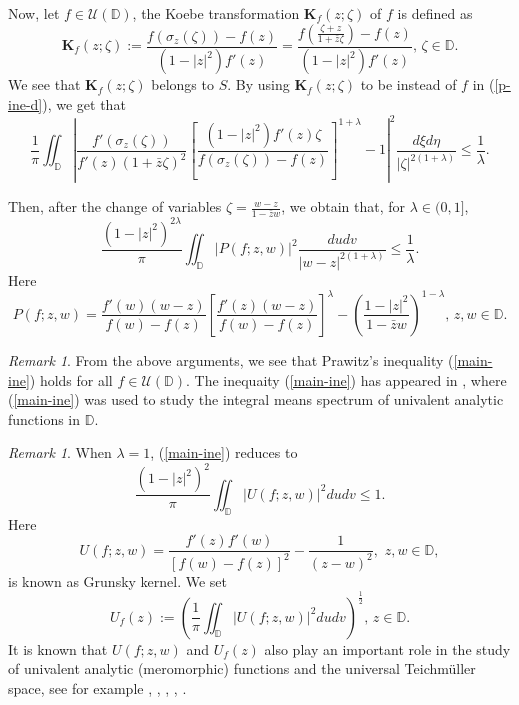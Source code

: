\documentclass[10pt]{amsart}
\theoremstyle{definition}
\theoremstyle{remark}
\newtheorem{remark}[theorem]{Remark}
\numberwithin{equation}{section}
\begin{document}
Now, let $f\in \mathcal{U}(\mathbb{D})$,  the Koebe transformation $\mathbf{K}_f(z; \zeta)$ of $f$ is defined as 
\begin{equation}\label{Koe}\mathbf{K}_f(z; \zeta):=\frac{f(\sigma_{z}(\zeta))-f(z)}{(1-|z|^2)f'(z)}=\frac{f\left(\frac{\zeta+z}{1+\bar{z}\zeta}\right)-f(z)}{(1-|z|^2)f'(z)},\, \zeta\in \mathbb{D}.\end{equation}
We see that $\mathbf{K}_f(z; \zeta)$ belongs to $S$.
By using $\mathbf{K}_f(z; \zeta)$ to be instead of $f$ in  (\ref{p-ine-d}), we get that 
\begin{equation}
\frac{1}{\pi}\iint_{\mathbb{D}}\left|\frac{ f'(\sigma_{z}(\zeta))}{f'(z)(1+\bar{z}\zeta)^2}
\left[\frac{(1-|z|^2)f'(z)\zeta}{f(\sigma_{z}(\zeta))-f(z)}\right]^{1+\lambda}-1\right|^2\frac{d\xi d\eta}{|\zeta|^{2(1+\lambda)}}\leq \frac{1}{\lambda}. \nonumber
\end{equation}

Then, after the change of variables $\zeta=\frac{w-z}{1-\bar{z}w}$,  we obtain that, for $\lambda\in (0, 1]$,
\begin{equation}\label{main-ine}
\frac{(1-|z|^2)^{2\lambda}}{\pi}\iint_{\mathbb{D}}\left|P(f; z, w)\right|^2\frac{dudv}{|w-z|^{2(1+\lambda)}} \leq  \frac{1}{\lambda}.
\end{equation}
Here 
\begin{equation}
P(f; z, w)=\frac{f'(w)(w-z)}{f(w)-f(z)}
\left[\frac{f'(z)(w-z)}{f(w)-f(z)}\right]^{\lambda}-\left(\frac{1-|z|^2}{1-\bar{z}w}\right)^{1-\lambda},\, z, w \in\mathbb{D}.\nonumber
\end{equation}

\begin{remark}
From the above arguments, we see that Prawitz’s inequality (\ref{main-ine}) holds for all $f\in \mathcal{U}(\mathbb{D})$.  The inequaity (\ref{main-ine}) has appeared in \cite{HS-1},  where (\ref{main-ine})  was used to study the integral means spectrum of univalent analytic functions in $\mathbb{D}$.
\end{remark}
\begin{remark} When $\lambda=1$,  (\ref{main-ine}) reduces to 
\begin{equation}
\frac{(1-|z|^2)^{2}}{\pi}\iint_{\mathbb{D}}|U(f; z,w)|^2dudv\leq 1. \nonumber
\end{equation}
Here $$U(f; z,w)=\frac{f'(z)f'(w)}{[f(w)-f(z)]^2}-\frac{1}{(z-w)^2},\,\, z, w\in \mathbb{D},$$
is known as Grunsky kernel. We set
$$U_f(z):=\left(
\frac{1}{\pi}\iint_{\mathbb{D}}|U(f; z,w)|^2dudv\right)^{\frac{1}{2}},\, z\in \mathbb{D}.$$
It is known that $U(f; z,w)$ and $U_f(z)$ also play an important role in the study of univalent analytic (meromorphic) functions and the universal Teichm\"uller space, see for example \cite{Ba}, \cite{Ha}, \cite{Sh-1}, \cite{Sh-2}, \cite{TT}.\end{remark}
\end{document}
